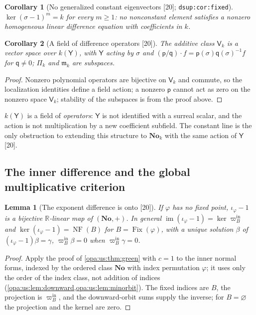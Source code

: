 \documentclass[11pt,oneside]{article}
\numberwithin{equation}{section}
\newtheorem{lemma}[lemma]{Lemma}
\newtheorem{corollary}[corollary]{Corollary}
\theoremstyle{definition}
\theoremstyle{remark}
\newcommand{\No}{\mathbf{No}}
\newcommand{\R}{\mathbb R}
\newcommand{\mm}{\mathfrak m}
\newcommand{\Fix}{\operatorname{Fix}}
\newcommand{\src}[1]{\textup{\textsf{\small[#1]}}}
\newcommand{\lbl}[1]{\nolinkurl{#1}}
\newcommand{\NF}{\operatorname{NF}}
\begin{document}
\begin{corollary}[No generalized constant eigenvectors \src{20}; \lbl{dsup:cor:fixed}]\label{opa:us:cor:noeigen}
$\ker(\sigma-1)^m=k$ for every $m\ge1$: no nonconstant element satisfies a nonzero homogeneous linear difference equation with coefficients in $k$.
\end{corollary}

\begin{corollary}[A field of difference operators \src{20}]\label{opa:us:cor:operatorfield}
The additive class $\mathsf V_k$ is a vector space over $k(\mathsf Y)$, with $\mathsf Y$ acting by $\sigma$ and $(\mathsf p/\mathsf q)\cdot f=\mathsf p(\sigma)\mathsf q(\sigma)^{-1}f$ for
$\mathsf q\ne0$; $\Pi_k$ and $\mm_k$ are subspaces.
\end{corollary}
\begin{proof}
Nonzero polynomial operators are bijective on $\mathsf V_k$ and commute, so the localization identities define a field action; a nonzero $\mathsf p$ cannot act
as zero on the nonzero space $\mathsf V_k$; stability of the subspaces is from the proof above.
\end{proof}

$k(\mathsf Y)$ is a field of \emph{operators}: $\mathsf Y$ is not identified with a surreal scalar, and the action is not multiplication by a new coefficient
subfield. The constant line is the only obstruction to extending this structure to $\No_k$ with the same action of $\mathsf Y$ \src{20}.

\subsection{The inner difference and the global multiplicative criterion}

\begin{lemma}[The exponent difference is onto \src{20}]\label{opa:us:lem:innerdiff}
If $\varphi$ has no fixed point, $\iota_\varphi-1$ is a bijective $\R$-linear map of $(\No,+)$. In general $\operatorname{im}(\iota_\varphi-1)=\ker\varpi^{\mathrm{in}}_B$
and $\ker(\iota_\varphi-1)=\NF(B)$ for $B=\Fix(\varphi)$, with a unique solution $\beta$ of $(\iota_\varphi-1)\beta=\gamma$, $\varpi^{\mathrm{in}}_B\beta=0$ when
$\varpi^{\mathrm{in}}_B\gamma=0$.
\end{lemma}
\begin{proof}
Apply the proof of \cref{opa:us:thm:green} with $c=1$ to the inner normal forms, indexed by the ordered class $\No$ with index permutation
$\varphi$; it uses only the order of the index class, not addition of indices (\cref{opa:us:lem:downward,opa:us:lem:minorbit}). The fixed indices are
$B$, the projection is $\varpi^{\mathrm{in}}_B$, and the downward-orbit sums supply the inverse; for $B=\varnothing$ the projection and the kernel are zero.
\end{proof}
\end{document}

